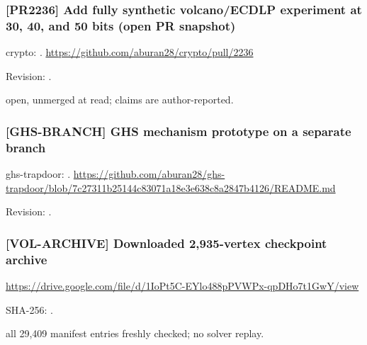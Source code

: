 \par\noindent\begin{minipage}{\linewidth}\small
\subsubsection*{[PR2236] Add fully synthetic volcano/ECDLP experiment at 30, 40, and 50 bits (open PR snapshot)}\label{art:PR2236}
crypto: .
\url{https://github.com/aburan28/crypto/pull/2236}
\par Revision: .
\par open, unmerged at read; claims are author-reported.
\end{minipage}\par\medskip

\par\noindent\begin{minipage}{\linewidth}\small
\subsubsection*{[GHS-BRANCH] GHS mechanism prototype on a separate branch}\label{art:GHS-BRANCH}
ghs-trapdoor: .
\url{https://github.com/aburan28/ghs-trapdoor/blob/7c27311b25144c83071a18e3e638c8a2847b4126/README.md}
\par Revision: .
\end{minipage}\par\medskip

\par\noindent\begin{minipage}{\linewidth}\small
\subsubsection*{[VOL-ARCHIVE] Downloaded 2,935-vertex checkpoint archive}\label{art:VOL-ARCHIVE}
\url{https://drive.google.com/file/d/1IoPt5C-EYlo488pPVWPx-qpDHo7t1GwY/view}
\par SHA-256: .
\par all 29,409 manifest entries freshly checked; no solver replay.
\end{minipage}\par\medskip

